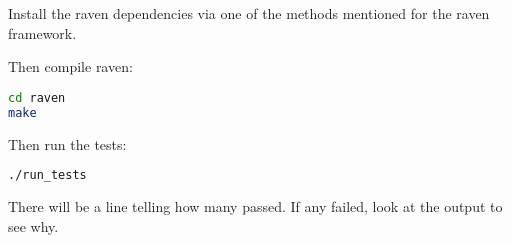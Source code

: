 Install the raven dependencies via one of the methods mentioned for
the raven framework.

Then compile raven:

\begin{lstlisting}[language=bash]
cd raven
make
\end{lstlisting}

Then run the tests:

\begin{lstlisting}[language=bash]
./run_tests
\end{lstlisting}

There will be a line telling how many passed.  If any failed, look at
the output to see why.
